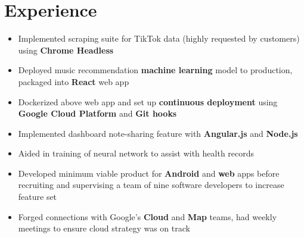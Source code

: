 \documentclass[]{houston-ethan-resume}
\begin{document}
\begin{minipage}[t]{0.66\textwidth}


\section{Experience}
	\begin{itemize}[noitemsep,topsep=0pt]
	\itemsep0em 
	\item Implemented scraping suite for TikTok data (highly requested by
		customers) using \textbf{Chrome Headless}
	\item Deployed music recommendation \textbf{machine learning} model to
		production, packaged into \textbf{React} web app
	\item Dockerized above web app and set up \textbf{continuous deployment}
		using \textbf{Google Cloud Platform} and \textbf{Git hooks}
	\item Implemented dashboard note-sharing feature with
		\textbf{Angular.js} and \textbf{Node.js}
	\end{itemize}

	\sectionsep

	\begin{itemize}[noitemsep,topsep=0pt]
	\itemsep0em 
	\item Aided in training of neural network to assist with health records
	\end{itemize}

	\sectionsep

	\begin{itemize}[noitemsep,topsep=0pt]
	\itemsep0em 
	\item Developed minimum viable product for \textbf{Android} and \textbf{web} apps before recruiting and supervising a team of nine software developers to increase feature set
	\item Forged connections with Google’s \textbf{Cloud} and \textbf{Map} teams, had weekly meetings to ensure cloud strategy was on track
	\end{itemize}


\end{minipage}
\end{document}
